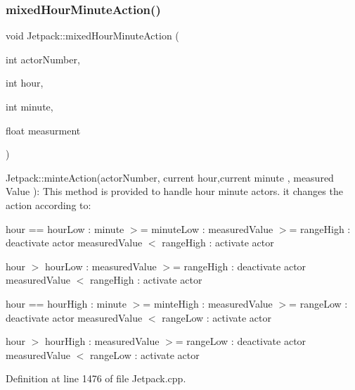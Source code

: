 \subsubsection{\texorpdfstring{mixed\+Hour\+Minute\+Action()}{mixedHourMinuteAction()}}
{\footnotesize\ttfamily void Jetpack\+::mixed\+Hour\+Minute\+Action (\begin{DoxyParamCaption}\item[{int}]{actor\+Number,  }\item[{int}]{hour,  }\item[{int}]{minute,  }\item[{float}]{measurment }\end{DoxyParamCaption})}

Jetpack\+::minte\+Action(actor\+Number, current hour,current minute , measured Value )\+: This method is provided to handle hour minute actors. it changes the action according to\+:

hour == hour\+Low \+: minute $>$= minute\+Low \+: measured\+Value $>$= range\+High \+: deactivate actor measured\+Value $<$ range\+High \+: activate actor

hour $>$ hour\+Low \+: measured\+Value $>$= range\+High \+: deactivate actor measured\+Value $<$ range\+High \+: activate actor

hour == hour\+High \+: minute $>$= minte\+High \+: measured\+Value $>$= range\+Low \+: deactivate actor measured\+Value $<$ range\+Low \+: activate actor

hour $>$ hour\+High \+: measured\+Value $>$= range\+Low \+: deactivate actor measured\+Value $<$ range\+Low \+: activate actor 

Definition at line 1476 of file Jetpack.\+cpp.


